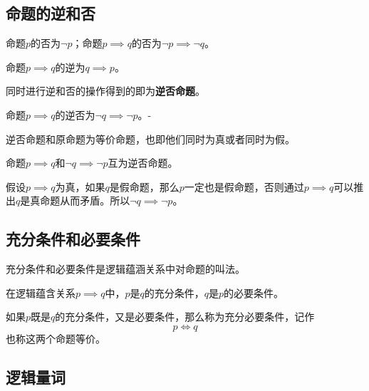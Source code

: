 \subsection{命题的逆和否}

\begin{definition}[否命题]
    命题$p$的否为$\neg p$；命题$p\implies q$的否为$\neg p \implies \neg q$。
\end{definition}

\begin{definition}[逆命题]
    命题$p\implies q$的逆为$q \implies p$。
\end{definition}

同时进行逆和否的操作得到的即为\textbf{逆否命题}。

\begin{definition}[逆否命题]
    命题$p\implies q$的逆否为$\neg q \implies \neg p$。-
\end{definition}

\begin{exercise}[逆否命题的真假]
    逆否命题和原命题为等价命题，也即他们同时为真或者同时为假。
\end{exercise}

\begin{solution}
    命题$p\implies q$和$\neg q \implies \neg p$互为逆否命题。

    假设$p\implies q$为真，如果$q$是假命题，那么$p$一定也是假命题，否则通过$p \implies q$可以推出$q$是真命题从而矛盾。所以$\neg q \implies \neg p$。
\end{solution}

\subsection{充分条件和必要条件}
充分条件和必要条件是逻辑蕴涵关系中对命题的叫法。

\begin{definition}[充分条件和必要条件]
    在逻辑蕴含关系$p\implies q$中，$p$是$q$的充分条件，$q$是$p$的必要条件。
\end{definition}

\begin{definition}[充要条件]
    如果$p$既是$q$的充分条件，又是必要条件，那么称为充分必要条件，记作
    $$
        p\iff q
    $$
    也称这两个命题等价。
\end{definition}

\subsection{逻辑量词}

